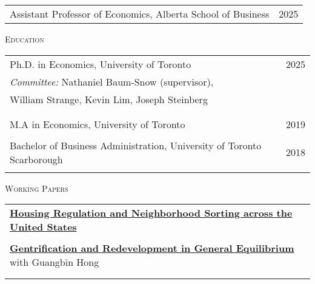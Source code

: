 \documentclass[11pt]{amsart}
\begin{document}
\normalsize
\begin{tabular}{ p{12.5cm}  p{5cm}}
	\large{Assistant Professor of Economics, Alberta School of Business}  & 2025  \\
 
\end{tabular}

\vspace{0.2cm}

\LARGE
\textsc{Education}
\vspace{0.2cm}

\normalsize
\begin{tabular}{ p{12.5cm}  p{5cm}}
  \large{Ph.D. in Economics, University of Toronto}  & 2025  \\
   \multicolumn{2}{l}{ \hspace{.75cm}  \emph{Committee:}  Nathaniel Baum-Snow (supervisor), } \\
     \hspace{2.8cm}  William Strange, Kevin Lim, Joseph Steinberg  \\
 \hspace{2.90cm}   \\
  \\
  \large{M.A in Economics, University of Toronto}    & 2019            \\
   \\
  \large{Bachelor of Business Administration, University of Toronto Scarborough}   & 2018            \\
                                                     &                 
\end{tabular}

\vspace{0.4cm}





\LARGE
\textsc{Working Papers}
\vspace{0.2cm}
\normalsize

\begin{tabular}{ p{15.5cm}}
 \href{https://jamesmacek.github.io/research/lswus}{\textbf{Housing Regulation and Neighborhood Sorting across the United States}}                         \\

\\
 \href{https://jamesmacek.github.io/research/gent}{\textbf{Gentrification and Redevelopment in General Equilibrium}} with Guangbin Hong \\
\\
\normalsize
\end{tabular}
\end{document}
